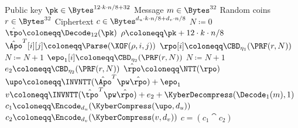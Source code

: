 \begin{algorithm}
  \caption{$\KyberCPAPKE.\PKEEnc(\pk, m, r)$: encryption
  \label{kybercpa-enc}}
  \begin{algorithmic}[1]
    \Require Public key $\pk \in \Bytes^{12\cdot k\cdot n/8 + 32}$
    \Require Message $m \in \Bytes^{32}$
    \Require Random coins $r \in \Bytes^{32}$
    \Ensure Ciphertext $c \in \Bytes^{d_u\cdot k\cdot n/8 + d_v\cdot n/8}$
    \State $N \coloneqq 0$
    \State $\hat{\tpo} \coloneqq \Decode_{12}(\pk)$
    \State $\rho \coloneqq \pk+12\cdot k\cdot n/8$
               
      \State $\hat{\Apo}^T[i][j] \coloneqq \Parse(\XOF(\rho, i, j))$     
    \EndFor
    \EndFor
    \label{line:kybercpa-enc:rpo}       
      \State $\rpo[i] \coloneqq \CBD_{\eta_1}(\PRF(r, N))$
      \State $N \coloneqq N+1$
    \EndFor
    \label{line:kybercpa-enc:epo}       
      \State $\epo_1[i] \coloneqq \CBD_{\eta_2}(\PRF(r, N))$
      \State $N \coloneqq N+1$
    \EndFor
    \State $e_2 \coloneqq \CBD_{\eta_2}(\PRF(r, N))$                 
    \State $\hat{\rpo} \coloneqq \NTT(\rpo)$\label{line:kybercpa-enc:nttr}
    \State $\upo \coloneqq \INVNTT(\hat{\Apo}^T \pw \hat{\rpo}) + \epo_1$\label{line:kybercpa-enc:invnttar} 
    \State $v \coloneqq \INVNTT(\hat{\tpo}^T\pw\hat{\rpo}) + e_2 + \KyberDecompress(\Decode_1(m),1)$ \label{line:kybercpa-enc:v} 
    \State $c_1 \coloneqq \Encode_{d_u}(\KyberCompress(\upo, d_u))$
    \State $c_2 \coloneqq \Encode_{d_v}(\KyberCompress(v, d_v))$
    \State \Return $c = (c_1\cat c_2)$ 
  \end{algorithmic}
\end{algorithm}

